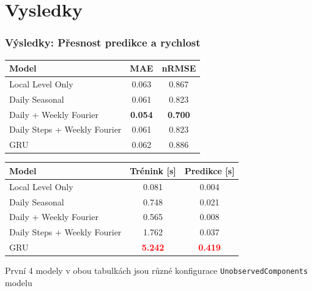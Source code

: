 \documentclass[czech,blue]{ctufit-presentation}
\begin{document}
\section{Vysledky}
\begin{frame}
	\frametitle{Výsledky: Přesnost predikce a rychlost}
	\centering
	\small
	\begin{tabular}{lcc}
		\toprule
		Model & MAE & nRMSE \\
		\midrule
		Local Level Only            & 0.063 & 0.867 \\
		Daily Seasonal              & 0.061 & 0.823 \\
		Daily + Weekly Fourier & \textbf{\textcolor{good}{0.054}} & \textbf{\textcolor{good}{0.700}} \\
		Daily Steps + Weekly Fourier& 0.061 & 0.823 \\
		GRU                         & 0.062 & 0.886 \\
		\bottomrule
	\end{tabular}

	\vspace{0.6em}

	\begin{tabular}{lcc}
	\toprule
	Model & Trénink [s] & Predikce [s] \\
	\midrule
	Local Level Only            & 0.081 & 0.004 \\
	Daily Seasonal              & 0.748 & 0.021 \\
	Daily + Weekly Fourier & 0.565 & 0.008 \\
	Daily Steps + Weekly Fourier& 1.762 & 0.037 \\
	GRU                         & \textbf{\textcolor{red}{5.242}} & \textbf{\textcolor{red}{0.419}} \\
	\bottomrule
	\end{tabular}

	\vspace{0.2em}
	{\scriptsize První 4 modely v obou tabulkách jsou různé konfigurace \texttt{UnobservedComponents} modelu}

\end{frame}

\end{document}

